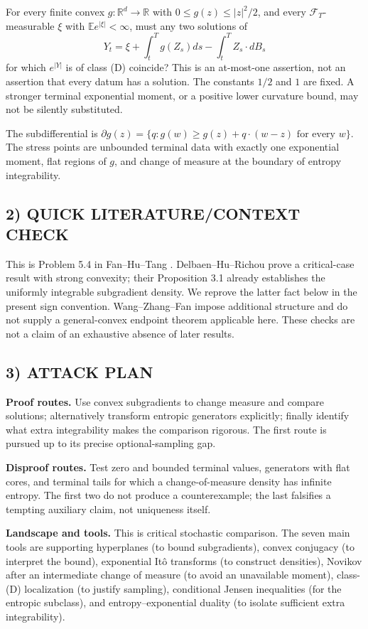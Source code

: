 \documentclass[11pt,a4paper]{article}
\newcommand{\R}{\mathbb R}
\newcommand{\E}{\mathbb E}
\newcommand{\F}{\mathcal F}
\theoremstyle{definition}
\begin{document}
For every finite convex $g:\R^d\to\R$ with $0\le g(z)\le |z|^2/2$, and every $\F_T$-measurable $\xi$ with $\E e^{|\xi|}<\infty$, must any two solutions of
\[
 Y_t=\xi+\int_t^Tg(Z_s)ds-\int_t^TZ_s\cdot dB_s
\]
for which $e^{|Y|}$ is of class (D) coincide? This is an at-most-one assertion, not an assertion that every datum has a solution. The constants $1/2$ and $1$ are fixed. A stronger terminal exponential moment, or a positive lower curvature bound, may not be silently substituted.

The subdifferential is
$\partial g(z)=\{q:g(w)\ge g(z)+q\cdot(w-z)\text{ for every }w\}$.
The stress points are unbounded terminal data with exactly one exponential moment, flat regions of $g$, and change of measure at the boundary of entropy integrability.

\subsection*{2) QUICK LITERATURE/CONTEXT CHECK}
This is Problem 5.4 in Fan--Hu--Tang \cite{FHT}. Delbaen--Hu--Richou \cite{DHR} prove a critical-case result with strong convexity; their Proposition 3.1 already establishes the uniformly integrable subgradient density. We reprove the latter fact below in the present sign convention. Wang--Zhang--Fan \cite{WZF} impose additional structure and do not supply a general-convex endpoint theorem applicable here. These checks are not a claim of an exhaustive absence of later results.

\subsection*{3) ATTACK PLAN}
\textbf{Proof routes.} Use convex subgradients to change measure and compare solutions; alternatively transform entropic generators explicitly; finally identify what extra integrability makes the comparison rigorous. The first route is pursued up to its precise optional-sampling gap.

\textbf{Disproof routes.} Test zero and bounded terminal values, generators with flat cores, and terminal tails for which a change-of-measure density has infinite entropy. The first two do not produce a counterexample; the last falsifies a tempting auxiliary claim, not uniqueness itself.

\textbf{Landscape and tools.} This is critical stochastic comparison. The seven main tools are supporting hyperplanes (to bound subgradients), convex conjugacy (to interpret the bound), exponential It\^o transforms (to construct densities), Novikov after an intermediate change of measure (to avoid an unavailable moment), class-(D) localization (to justify sampling), conditional Jensen inequalities (for the entropic subclass), and entropy--exponential duality (to isolate sufficient extra integrability).
\end{document}
